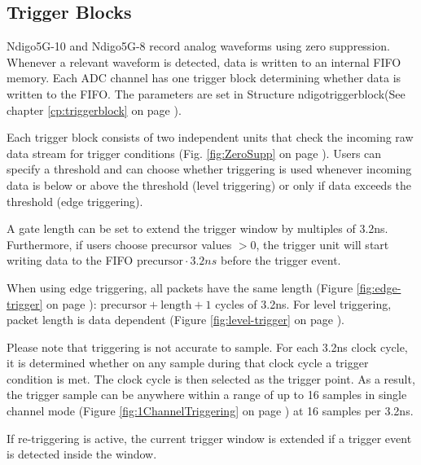 \subsection{Trigger Blocks}

Ndigo5G-10 and Ndigo5G-8 record analog waveforms using zero suppression. Whenever a relevant waveform is detected, data is written to an internal FIFO memory. Each ADC channel has one trigger block determining whether data is written to the FIFO. The parameters are set in  Structure \textsf{ndigo\tu trigger\tu block}(See chapter \ref{cp:triggerblock} on page \pageref{cp:triggerblock}).\par

Each trigger block consists of two independent units that check the incoming raw data stream for trigger conditions (Fig. \ref{fig:ZeroSupp} on page \pageref{fig:ZeroSupp}). Users can specify a threshold and can choose whether triggering is used whenever incoming data is below or above the threshold (level triggering) or only if data exceeds the threshold (edge triggering).\par

A gate length can be set to extend the trigger window by multiples of 3.2ns. Furthermore, if users choose precursor values $> 0$, the trigger unit will start writing data to the FIFO $\text{precursor}\cdot 3.2ns$ before the trigger event.\par

When using edge triggering, all packets have the same length (Figure \ref{fig:edge-trigger} on page \pageref{fig:edge-trigger}): $\text{precursor}+\text{length}+1$ cycles of 3.2ns. For level triggering, packet length is data dependent (Figure \ref{fig:level-trigger} on page \pageref{fig:level-trigger}).\par

Please note that triggering is not accurate to sample. For each 3.2ns clock cycle, it is determined whether on any sample during that clock cycle a trigger condition is met. The clock cycle is then selected as the trigger point. As a result, the trigger sample can be anywhere within a range of up to 16 samples in single channel mode (Figure \ref{fig:1ChannelTriggering} on page \pageref{fig:1ChannelTriggering}) at 16 samples per 3.2ns.\par

If re-triggering is active, the current trigger window is extended if a trigger event is detected inside the window.\par

